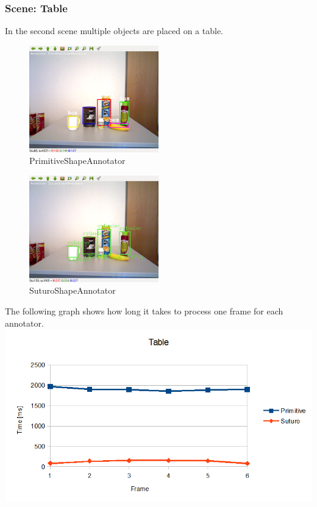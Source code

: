 \documentclass[main.tex]{subfiles}
\begin{document}
\subsubsection{Scene: Table}
In the second scene multiple objects are placed on a table.
\begin{figure}
  \center
  \includegraphics[width=0.5\textwidth]{pictures/perception/shape_annotator/classification_test_table/primitive.png}
  \caption{PrimitiveShapeAnnotator}
  \label{fig:shapeAnnotatorShelvePrimitive}
\end{figure}
\begin{figure}
  \center
  \includegraphics[width=0.5\textwidth]{pictures/perception/shape_annotator/classification_test_table/suturo.png}
  \caption{SuturoShapeAnnotator}
  \label{fig:shapeAnnotatorShelveSuturo}
\end{figure}

The following graph shows how long it takes to process one frame for each annotator.
{\center
  \includegraphics[width=1.2\textwidth]{pictures/perception/shape_annotator/classification_test_table/chart.png}
}
\newpage
\end{document}
